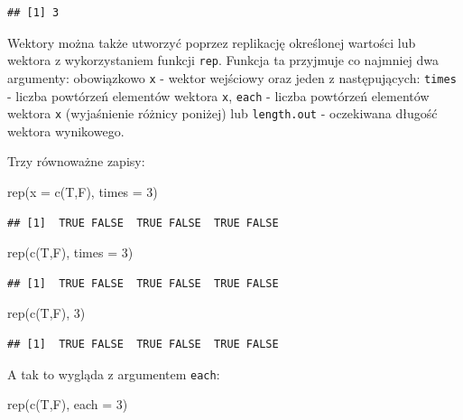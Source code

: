 \documentclass[
]{book}
\newenvironment{Shaded}{\begin{snugshade}}{\end{snugshade}}
\newcommand{\AttributeTok}[1]{\textcolor[rgb]{0.77,0.63,0.00}{#1}}
\newcommand{\DecValTok}[1]{\textcolor[rgb]{0.00,0.00,0.81}{#1}}
\newcommand{\FunctionTok}[1]{\textcolor[rgb]{0.00,0.00,0.00}{#1}}
\newcommand{\NormalTok}[1]{#1}
\begin{document}
\begin{verbatim}
## [1] 3
\end{verbatim}

Wektory można także utworzyć poprzez replikację określonej wartości lub wektora z wykorzystaniem funkcji \texttt{rep}. Funkcja ta przyjmuje co najmniej dwa argumenty: obowiązkowo \texttt{x} - wektor wejściowy oraz jeden z następujących: \texttt{times} - liczba powtórzeń elementów wektora \texttt{x}, \texttt{each} - liczba powtórzeń elementów wektora \texttt{x} (wyjaśnienie różnicy poniżej) lub \texttt{length.out} - oczekiwana długość wektora wynikowego.

Trzy równoważne zapisy:

\begin{Shaded}
\begin{Highlighting}[]
\FunctionTok{rep}\NormalTok{(}\AttributeTok{x =} \FunctionTok{c}\NormalTok{(T,F), }\AttributeTok{times =} \DecValTok{3}\NormalTok{)}
\end{Highlighting}
\end{Shaded}

\begin{verbatim}
## [1]  TRUE FALSE  TRUE FALSE  TRUE FALSE
\end{verbatim}

\begin{Shaded}
\begin{Highlighting}[]
\FunctionTok{rep}\NormalTok{(}\FunctionTok{c}\NormalTok{(T,F), }\AttributeTok{times =} \DecValTok{3}\NormalTok{)}
\end{Highlighting}
\end{Shaded}

\begin{verbatim}
## [1]  TRUE FALSE  TRUE FALSE  TRUE FALSE
\end{verbatim}

\begin{Shaded}
\begin{Highlighting}[]
\FunctionTok{rep}\NormalTok{(}\FunctionTok{c}\NormalTok{(T,F), }\DecValTok{3}\NormalTok{)}
\end{Highlighting}
\end{Shaded}

\begin{verbatim}
## [1]  TRUE FALSE  TRUE FALSE  TRUE FALSE
\end{verbatim}

A tak to wygląda z argumentem \texttt{each}:

\begin{Shaded}
\begin{Highlighting}[]
\FunctionTok{rep}\NormalTok{(}\FunctionTok{c}\NormalTok{(T,F), }\AttributeTok{each =} \DecValTok{3}\NormalTok{)}
\end{Highlighting}
\end{Shaded}
\end{document}
